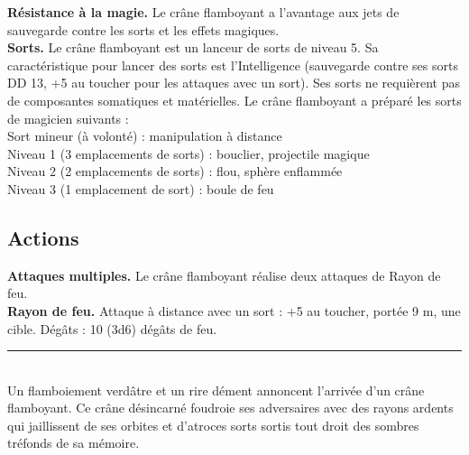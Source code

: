 \begin{figure*}[hb!]
{\begin{minipage}[c]{.45\linewidth}
  \end{minipage}
  \hspace{4pt}
  \begin{minipage}[c]{.45\linewidth}
    {\bfseries Résistance à la magie.} Le crâne flamboyant a l'avantage aux jets de sauvegarde contre les sorts et les effets magiques. \\
    {\bfseries Sorts.} Le crâne flamboyant est un lanceur de sorts de niveau 5. Sa caractéristique pour lancer des sorts est l'Intelligence (sauvegarde contre ses sorts DD 13, +5 au toucher pour les attaques avec un sort). Ses sorts ne requièrent pas de composantes somatiques et matérielles. Le crâne flamboyant a préparé les sorts de magicien suivants : \\
Sort mineur (à volonté) : manipulation à distance \\
Niveau 1 (3 emplacements de sorts) : bouclier, projectile magique \\
Niveau 2 (2 emplacements de sorts) : flou, sphère enflammée \\
Niveau 3 (1 emplacement de sort) : boule de feu 
\vspace{-10pt}
    \subsection*{Actions}
    {\bfseries Attaques multiples.} Le crâne flamboyant réalise deux attaques de Rayon de feu. \\
    {\bfseries Rayon de feu.} Attaque à distance avec un sort : +5 au toucher, portée 9 m, une cible. Dégâts : 10 (3d6) dégâts de feu. \\
    \noindent\rule{\textwidth}{1pt} \\
Un flamboiement verdâtre et un rire dément annoncent l'arrivée d'un crâne flamboyant. Ce crâne désincarné foudroie ses adversaires avec des rayons ardents qui jaillissent de ses orbites et d'atroces sorts sortis tout droit des sombres tréfonds de sa mémoire.
  \end{minipage}
}%
\end{figure*}

